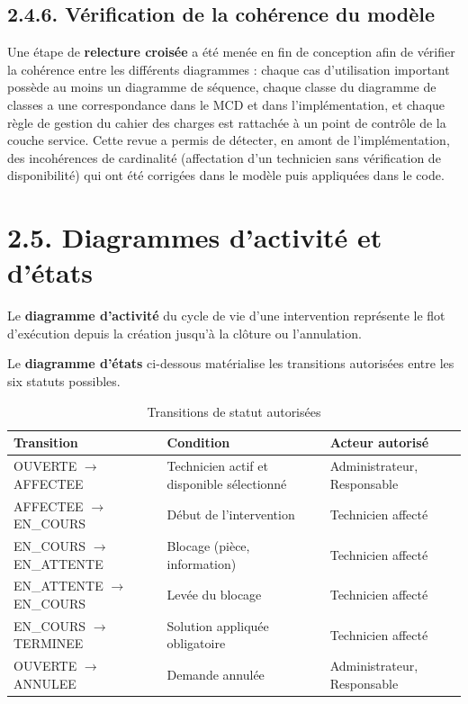 \documentclass[11pt,a4paper]{report}
\begin{document}
\subsection*{2.4.6. Vérification de la cohérence du modèle}

Une étape de \textbf{relecture croisée} a été menée en fin de conception afin de vérifier la cohérence entre les différents diagrammes : chaque cas d'utilisation important possède au moins un diagramme de séquence, chaque classe du diagramme de classes a une correspondance dans le MCD et dans l'implémentation, et chaque règle de gestion du cahier des charges est rattachée à un point de contrôle de la couche service. Cette revue a permis de détecter, en amont de l'implémentation, des incohérences de cardinalité (affectation d'un technicien sans vérification de disponibilité) qui ont été corrigées dans le modèle puis appliquées dans le code.
\section*{2.5. Diagrammes d'activité et d'états}

Le \textbf{diagramme d'activité} du cycle de vie d'une intervention représente le flot d'exécution depuis la création jusqu'à la clôture ou l'annulation.

Le \textbf{diagramme d'états} ci-dessous matérialise les transitions autorisées entre les six statuts possibles.
\begin{table}[htbp]\centering\small
\begin{tabularx}{\textwidth}{|X|X|X|}
\hline\rowcolor{hdr}\textbf{Transition} & \textbf{Condition} & \textbf{Acteur autorisé}\\ \hline
OUVERTE $\rightarrow$ AFFECTEE & Technicien actif et disponible sélectionné & Administrateur, Responsable\\ \hline
AFFECTEE $\rightarrow$ EN\_COURS & Début de l'intervention & Technicien affecté\\ \hline
EN\_COURS $\rightarrow$ EN\_ATTENTE & Blocage (pièce, information) & Technicien affecté\\ \hline
EN\_ATTENTE $\rightarrow$ EN\_COURS & Levée du blocage & Technicien affecté\\ \hline
EN\_COURS $\rightarrow$ TERMINEE & Solution appliquée obligatoire & Technicien affecté\\ \hline
OUVERTE $\rightarrow$ ANNULEE & Demande annulée & Administrateur, Responsable\\ \hline
\end{tabularx}
\caption{Transitions de statut autorisées}
\end{table}
\end{document}
